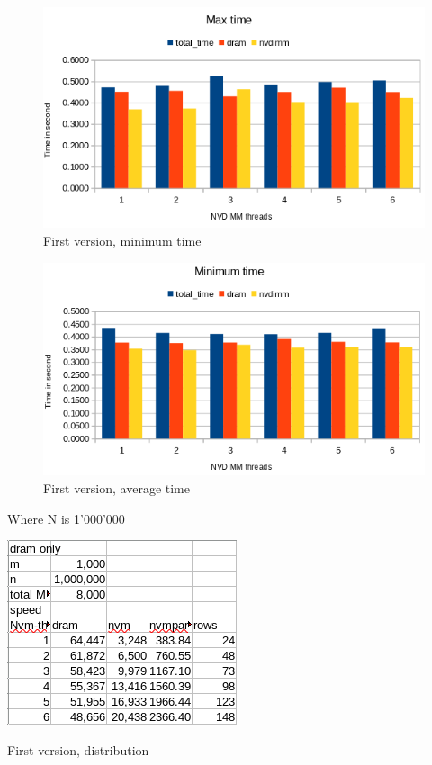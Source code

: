 \documentclass[12pt,a4paper,USenglish]{article}      %
\begin{document}
\begin{figure}[!hbtp]
\includegraphics[scale=0.7]{Large_Array_test/First_version_2k_500k_MaxTime.png}
\caption{First version, minimum time}
\end{figure}

\begin{figure}[!hbtp]
\includegraphics[scale=0.7]{Large_Array_test/First_version_2k_500k_MinTime.png}
\caption{First version, average time}
\end{figure}

\clearpage
Where N is 1'000'000
\begin{table}[!hbtp]
\includegraphics[scale=0.6]{Large_Array_test/First_version_1k_1000k_Distribution.png}
\caption{First version, distribution}
\end{table}
\end{document}
